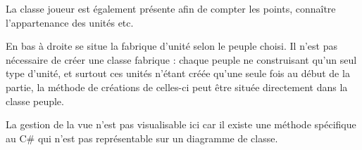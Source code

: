 \documentclass[a4paper]{article}%
\begin{document}
La classe joueur est également présente afin de compter les points, connaître l'appartenance des unités etc.

\medskip

	En bas à droite se situe la fabrique d'unité selon le peuple choisi. Il n'est pas nécessaire de créer une classe fabrique : chaque peuple ne construisant qu'un seul type d'unité, et surtout ces unités n'étant créée qu'une seule fois au début de la partie, la méthode de créations de celles-ci peut être située directement dans la classe peuple.

\medskip

	La gestion de la vue n'est pas visualisable ici car il existe une méthode spécifique au C\# qui n'est pas représentable sur un diagramme de classe.


\begin{figure}[H]
    \centering

\end{figure}
\end{document}
